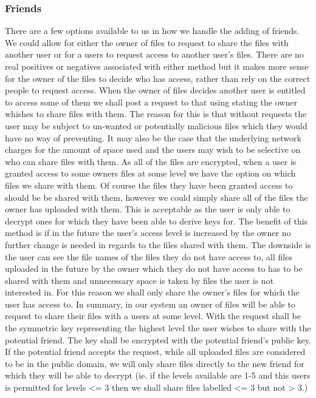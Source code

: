 \documentclass[12pt, titlepage]{article}
\begin{document}
\subsubsection{Friends}
There are a few options available to us in how we handle the adding of friends. We could allow for either the owner of files to request to share the files with another user or for a users to request access to another user's files. There are no real positives or negatives associated with either method but it makes more sense for the owner of the files to decide who has access, rather than rely on the correct people to request access.
\newline \indent When the owner of files decides another user is entitled to access some of them we shall post a request to that using stating the owner whishes to share files with them. The reason for this is that without requests the user may be subject to un-wanted or potentially malicious files which they would have no way of preventing. It may also be the case that the underlying network charges for the amount of space used and the users may wish to be selective on who can share files with them.
\newline \indent As all of the files are encrypted, when a user is granted access to some owners files at some level we have the option on which files we share with them. Of course the files they have been granted access to should be be shared with them, however we could simply share all of the files the owner has uploaded with them. This is acceptable as the user is only able to decrypt ones for which they have been able to derive keys for. The benefit of this method is if in the future the user's access level is increased by the owner no further change is needed in regards to the files shared with them. The downside is the user can see the file names of the files they do not have access to, all files uploaded in the future by the owner which they do not have access to has to be shared with them and unnecessary space is taken by files the user is not interested in. For this reason we shall only share the owner's files for which the user has access to.
In summary, in our system an owner of files will be able to request to share their files with a users at some level. With the request shall be the symmetric key representing the highest level the user wishes to share with the potential friend. The key shall be encrypted with the potential friend's public key. If the potential friend accepts the request, while all uploaded files are considered to be in the public domain, we will only share files directly to the new friend for which they will be able to decrypt (ie. if the levels available are 1-5 and this users is permitted for levels <= 3 then we shall share files labelled <= 3 but not > 3.)
\end{document}
